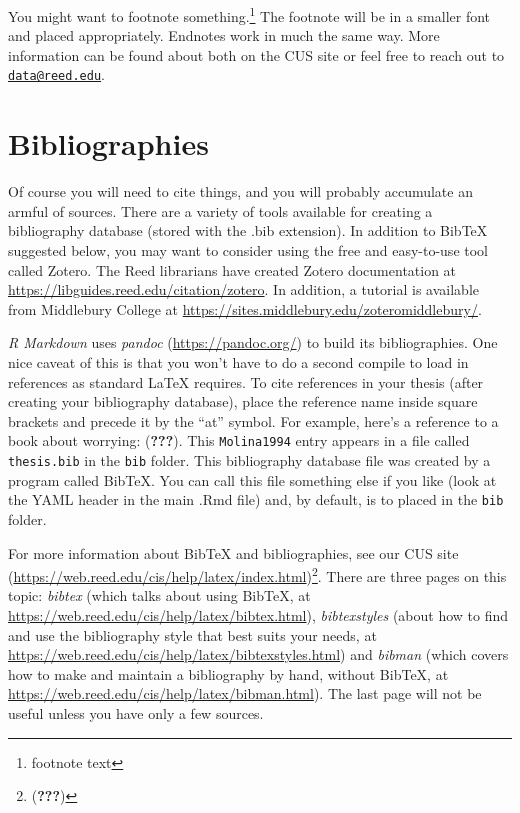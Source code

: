 \documentclass[12pt,twoside]{reedthesis}
\begin{document}
You might want to footnote something.\footnote{footnote text} The footnote will be in a smaller font and placed appropriately. Endnotes work in much the same way. More information can be found about both on the CUS site or feel free to reach out to \href{mailto:data@reed.edu}{\nolinkurl{data@reed.edu}}.

\hypertarget{bibliographies}{%
\section{Bibliographies}\label{bibliographies}}

Of course you will need to cite things, and you will probably accumulate an armful of sources. There are a variety of tools available for creating a bibliography database (stored with the .bib extension). In addition to BibTeX suggested below, you may want to consider using the free and easy-to-use tool called Zotero. The Reed librarians have created Zotero documentation at \url{https://libguides.reed.edu/citation/zotero}. In addition, a tutorial is available from Middlebury College at \url{https://sites.middlebury.edu/zoteromiddlebury/}.

\emph{R Markdown} uses \emph{pandoc} (\url{https://pandoc.org/}) to build its bibliographies. One nice caveat of this is that you won't have to do a second compile to load in references as standard LaTeX requires. To cite references in your thesis (after creating your bibliography database), place the reference name inside square brackets and precede it by the ``at'' symbol. For example, here's a reference to a book about worrying: ({\textbf{???}}). This \texttt{Molina1994} entry appears in a file called \texttt{thesis.bib} in the \texttt{bib} folder. This bibliography database file was created by a program called BibTeX. You can call this file something else if you like (look at the YAML header in the main .Rmd file) and, by default, is to placed in the \texttt{bib} folder.

For more information about BibTeX and bibliographies, see our CUS site (\url{https://web.reed.edu/cis/help/latex/index.html})\footnote{({\textbf{???}})}. There are three pages on this topic: \emph{bibtex} (which talks about using BibTeX, at \url{https://web.reed.edu/cis/help/latex/bibtex.html}), \emph{bibtexstyles} (about how to find and use the bibliography style that best suits your needs, at \url{https://web.reed.edu/cis/help/latex/bibtexstyles.html}) and \emph{bibman} (which covers how to make and maintain a bibliography by hand, without BibTeX, at \url{https://web.reed.edu/cis/help/latex/bibman.html}). The last page will not be useful unless you have only a few sources.
\end{document}
